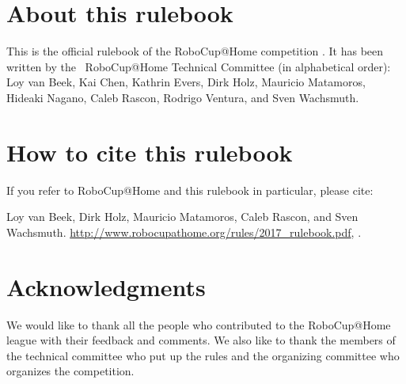 


\section*{About this rulebook}
This is the official rulebook of the RoboCup@Home competition \YEAR.
It has been written by the \YEAR ~RoboCup@Home Technical Committee (in alphabetical order): 
Loy van Beek,
Kai Chen,
Kathrin Evers,
Dirk Holz,
Mauricio Matamoros, 
Hideaki Nagano,
Caleb Rascon,
Rodrigo Ventura, and 
Sven Wachsmuth.

\section*{How to cite this rulebook}
If you refer to RoboCup@Home and this rulebook in particular, please cite:

Loy van Beek, Dirk Holz, Mauricio Matamoros, Caleb Rascon, and Sven Wachsmuth. 
\url{http://www.robocupathome.org/rules/2017_rulebook.pdf}, \YEAR.



\section*{Acknowledgments}
\label{sec:acknowledgments}


We would like to thank all the people who contributed to the RoboCup@Home league 
with their feedback and comments. 
We also like to thank the members of the technical committee who put up the rules
and the organizing committee who organizes the competition.  

